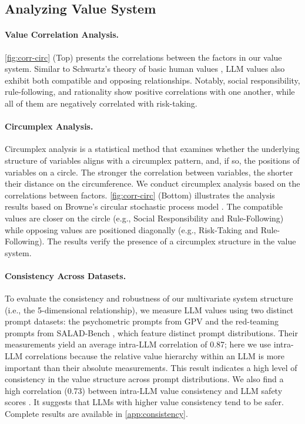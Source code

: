 \subsection{Analyzing Value System}

\paragraph{Value Correlation Analysis.}
\cref{fig:corr-circ} (Top) presents the correlations between the factors in our value system. Similar to Schwartz's theory of basic human values \cite{schwartz2012overview}, LLM values also exhibit both compatible and opposing relationships. Notably, social responsibility, rule-following, and rationality show positive correlations with one another, while all of them are negatively correlated with risk-taking.

\paragraph{Circumplex Analysis.}
Circumplex analysis is a statistical method that examines whether the underlying structure of variables aligns with a circumplex pattern, and, if so, the positions of variables on a circle. The stronger the correlation between variables, the shorter their distance on the circumference.
We conduct circumplex analysis based on the correlations between factors. \cref{fig:corr-circ} (Bottom) illustrates the analysis results based on Browne's circular stochastic process model \cite{browne1992circumplex, grassi2010circe}. The compatible values are closer on the circle (e.g., Social Responsibility and Rule-Following) while opposing values are positioned diagonally (e.g., Risk-Taking and Rule-Following). The results verify the presence of a circumplex structure in the value system.

\paragraph{Consistency Across Datasets.} To evaluate the consistency and robustness of our multivariate system structure (i.e., the 5-dimensional relationship), we measure LLM values using two distinct prompt datasets: the psychometric prompts from GPV \cite{ye2025gpv} and the red-teaming prompts from SALAD-Bench \cite{li2024salad}, which feature distinct prompt distributions. Their measurements yield an average intra-LLM correlation of 0.87; here we use intra-LLM correlations because the relative value hierarchy within an LLM is more important than their absolute measurements. This result indicates a high level of consistency in the value structure across prompt distributions. We also find a high correlation (0.73) between intra-LLM value consistency and LLM safety scores \cite{li2024salad}. It suggests that LLMs with higher value consistency tend to be safer. Complete results are available in \cref{app:consistency}.


